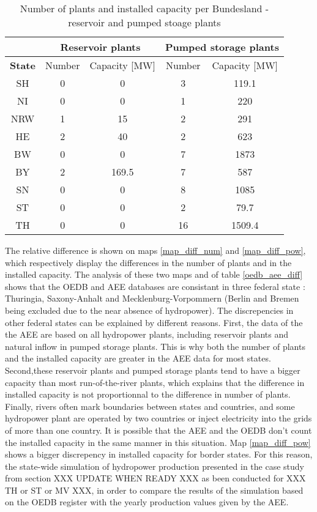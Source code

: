 \begin{table}
\footnotesize
  \caption[Number of plants and installed capacity per Bundesland - reservoir and pumped stoage plants]{Number of plants and installed capacity per Bundesland - reservoir and pumped stoage plants \cite{oedb}}
  \centering
  \label{oedb_pump_res}
  \begin{tabular}{|c|cc|cc| }
  \cline{2-5}
  \multicolumn{0}{c|}{} &\multicolumn{2}{|c}{\textbf{Reservoir plants}}&\multicolumn{2}{|c|}{\textbf{Pumped storage plants}} \\
  \hline
  \textbf{State} & Number 	& 	Capacity [MW] 	&	Number 	& 	Capacity [MW] 	 \\
  \hline
  SH	&	0	&	0		&	3	&	119.1	\\
  NI	&	0	&	0		&	1	&	220	\\
  NRW	&	1	&	15		&	2	&	291	\\
  HE	&	2	&	40		&	2	&	623	\\
  BW	&	0	&	0		&	7	&	1873	\\	
  BY	&	2	&	169.5		&	7	&	587	\\
  SN	&	0	&	0		&	8	&	1085	\\
  ST	&	0	&	0		&	2	&	79.7	\\
  TH	&	0	&	0		&	16	&	1509.4	\\
  \hline
  \end{tabular}
\end{table}


The relative difference is shown on maps \ref{map_diff_num} and \ref{map_diff_pow}, which respectively display the differences in the number of plants and in the installed capacity. The analysis of these two maps and of table \ref{oedb_aee_diff} shows that the OEDB and AEE databases are consistant in three federal state : Thuringia, Saxony-Anhalt and Mecklenburg-Vorpommern (Berlin and Bremen being excluded due to the near absence of hydropower). The discrepencies in other federal states can be explained by different reasons. First, the data of the the AEE are based on all hydropower plants, including reservoir plants and natural inflow in pumped storage plants. This is why both the number of plants and the installed capacity are greater in the AEE data for most states. Second,these reservoir plants and pumped storage plants tend to have a bigger capacity than most run-of-the-river plants, which explains that the difference in installed capacity is not proportionnal to the difference in number of plants. Finally, rivers often mark boundaries between states and countries, and some hydropower plant are operated by two countries or inject electricity into the grids of more than one country. It is possible that the AEE and the OEDB don't count the installed capacity in the same manner in this situation. Map \ref{map_diff_pow} shows a bigger discrepency in installed capacity for border states.
\newline
For this reason, the state-wide simulation of hydropower production presented in the case study from section XXX UPDATE WHEN READY XXX as been conducted for XXX TH or ST or MV XXX, in order to compare the results of the simulation based on the OEDB register with the yearly production values given by the AEE.

